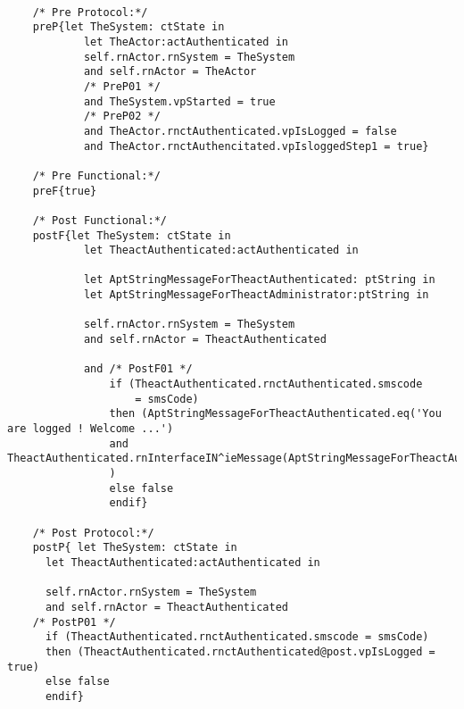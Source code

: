 	\scriptsize
	\vspace{0.5cm}
	\begin{lstlisting}[style=MessirStyle,firstnumber=auto,captionpos=b,caption={\msrmessir (MCL-oriented) specification of the operation \emph{oeSMS}.},label=OM-actAuthenticated-oeSMS-MCL-LST]

	/* Pre Protocol:*/ 
	preP{let TheSystem: ctState in
	  		let TheActor:actAuthenticated in
	  		self.rnActor.rnSystem = TheSystem
	  		and self.rnActor = TheActor
			/* PreP01 */
	  		and TheSystem.vpStarted = true
			/* PreP02 */
	  		and TheActor.rnctAuthenticated.vpIsLogged = false
	  		and TheActor.rnctAuthencitated.vpIsloggedStep1 = true}
	
	/* Pre Functional:*/
	preF{true}
	
	/* Post Functional:*/ 
	postF{let TheSystem: ctState in
	  		let TheactAuthenticated:actAuthenticated in
	
	  		let AptStringMessageForTheactAuthenticated: ptString in
	  		let AptStringMessageForTheactAdministrator:ptString in
	  
	  		self.rnActor.rnSystem = TheSystem
	  		and self.rnActor = TheactAuthenticated
	  
	  		and /* PostF01 */
	      		if (TheactAuthenticated.rnctAuthenticated.smscode
	          		= smsCode)	
	      		then (AptStringMessageForTheactAuthenticated.eq('You are logged ! Welcome ...')
	            and TheactAuthenticated.rnInterfaceIN^ieMessage(AptStringMessageForTheactAuthenticated)
	           	)
	        	else false
	        	endif}
	
	/* Post Protocol:*/ 
	postP{ let TheSystem: ctState in
	  let TheactAuthenticated:actAuthenticated in
	
	  self.rnActor.rnSystem = TheSystem
	  and self.rnActor = TheactAuthenticated
	/* PostP01 */
	  if (TheactAuthenticated.rnctAuthenticated.smscode = smsCode)
	  then (TheactAuthenticated.rnctAuthenticated@post.vpIsLogged = true)
	  else false
	  endif}
	
	\end{lstlisting}
	\normalsize 
	
	
	
	






